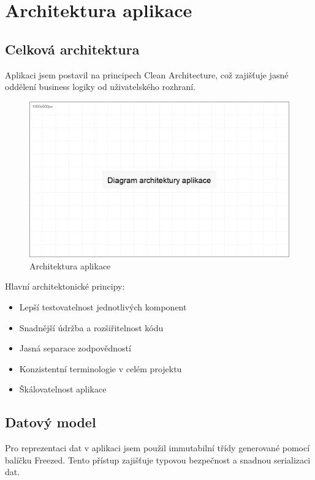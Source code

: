 \documentclass[12pt, a4paper, twoside, openright]{report}
\begin{document}
\chapter{Architektura aplikace}
	\section{Celková architektura}
	Aplikaci jsem postavil na principech Clean Architecture, což zajišťuje jasné oddělení business logiky od uživatelského rozhraní.

	\begin{figure}[h]
		\centering
		\includegraphics[width=0.8\linewidth]{image/diagram-architektura.png}
		\caption{Architektura aplikace}
		\label{fig:architecture}
	\end{figure}

	Hlavní architektonické principy:
	\begin{itemize}
		\item Lepší testovatelnost jednotlivých komponent
		\item Snadnější údržba a rozšiřitelnost kódu
		\item Jasná separace zodpovědností
		\item Konzistentní terminologie v celém projektu
		\item Škálovatelnost aplikace
	\end{itemize}

	\section{Datový model}
	Pro reprezentaci dat v aplikaci jsem použil immutabilní třídy generované pomocí balíčku Freezed. Tento přístup zajišťuje typovou bezpečnost a snadnou serializaci dat.
\end{document}
